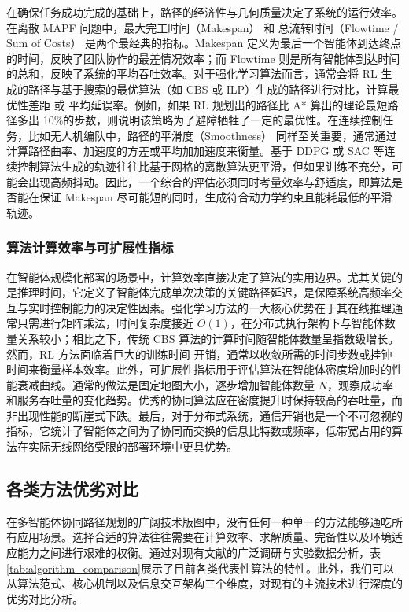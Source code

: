 \documentclass[13.5pt]{extarticle}
\newcommand{\figref}[1]{\hypersetup{linkcolor=red}\ref{#1}}
\begin{document}
在确保任务成功完成的基础上，路径的经济性与几何质量决定了系统的运行效率。在离散 MAPF 问题中，最大完工时间（Makespan） 和 总流转时间（Flowtime / Sum of Costs） 是两个最经典的指标。Makespan 定义为最后一个智能体到达终点的时间，反映了团队协作的最差情况效率；而 Flowtime 则是所有智能体到达时间的总和，反映了系统的平均吞吐效率。对于强化学习算法而言，通常会将 RL 生成的路径与基于搜索的最优算法（如 CBS 或 ILP）生成的路径进行对比，计算最优性差距 或 平均延误率。例如，如果 RL 规划出的路径比 A* 算出的理论最短路径多出 10\%的步数，则说明该策略为了避障牺牲了一定的最优性。在连续控制任务，比如无人机编队中，路径的平滑度（Smoothness） 同样至关重要，通常通过计算路径曲率、加速度的方差或平均加加速度来衡量。基于 DDPG 或 SAC 等连续控制算法生成的轨迹往往比基于网格的离散算法更平滑，但如果训练不充分，可能会出现高频抖动。因此，一个综合的评估必须同时考量效率与舒适度，即算法是否能在保证 Makespan 尽可能短的同时，生成符合动力学约束且能耗最低的平滑轨迹。

\subsubsection{算法计算效率与可扩展性指标}

在智能体规模化部署的场景中，计算效率直接决定了算法的实用边界。尤其关键的是推理时间，它定义了智能体完成单次决策的关键路径延迟，是保障系统高频率交互与实时控制能力的决定性因素。强化学习方法的一大核心优势在于其在线推理通常只需进行矩阵乘法，时间复杂度接近 $O(1)$，在分布式执行架构下与智能体数量关系较小；相比之下，传统 CBS 算法的计算时间随智能体数量呈指数级增长。然而，RL 方法面临着巨大的训练时间 开销，通常以收敛所需的时间步数或挂钟时间来衡量样本效率。此外，可扩展性指标用于评估算法在智能体密度增加时的性能衰减曲线。通常的做法是固定地图大小，逐步增加智能体数量 $N$，观察成功率和服务吞吐量的变化趋势。优秀的协同算法应在密度提升时保持较高的吞吐量，而非出现性能的断崖式下跌。最后，对于分布式系统，通信开销也是一个不可忽视的指标，它统计了智能体之间为了协同而交换的信息比特数或频率，低带宽占用的算法在实际无线网络受限的部署环境中更具优势。

\subsection{各类方法优劣对比}

在多智能体协同路径规划的广阔技术版图中，没有任何一种单一的方法能够通吃所有应用场景。选择合适的算法往往需要在计算效率、求解质量、完备性以及环境适应能力之间进行艰难的权衡。通过对现有文献的广泛调研与实验数据分析，表\figref{tab:algorithm_comparison}展示了目前各类代表性算法的特性。此外，我们可以从算法范式、核心机制以及信息交互架构三个维度，对现有的主流技术进行深度的优劣对比分析。
\end{document}

